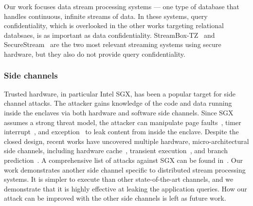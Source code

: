 Our work focuses data stream processing systems --- one type of database that handles continuous, infinite streams of 
data. In these systems, query confidentiality, which is overlooked in the other works targeting relational databsaes, is 
as important as data confidentiality. StreamBox-TZ~\cite{234964} and SecureStream~\cite{DBLP:journals/corr/abs-1805-01752} are the two most 
relevant streaming systems using secure hardware, but they also do not provide query confidentiality. 

\subsubsection*{Side channels}
Trusted hardware, in particular Intel SGX, has been a popular target for side channel attacks. The attacker gains
knowledge of the code and data running inside the enclaves via both hardware and software side channels. Since SGX
assumes a strong threat model, the attacker can manipulate page faults~\cite{van2017telling}, timer                         interrupt~\cite{van2017sgx}, and exception~\cite{cui2021smashex} to leak content from inside the enclave. Despite the           closed design, recent works have uncovered multiple hardware, micro-architectural side channels, including hardware              
cache~\cite{brasser2017software, van2021cacheout}, transient execution~\cite{van2018foreshadow}, and branch
prediction~\cite{lee2017inferring}. A comprehensive list of attacks against SGX can be found in~\cite{van2024sok}. Our 
work demonstrates another side channel specific to distributed stream processing systems. It is simpler to execute than 
other state-of-the-art channels, and we demonstrate that it is highly effective at leaking the application queries. How 
our attack can be improved with the other side channels is left as future work.